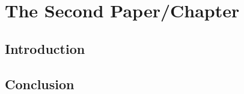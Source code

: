 \chapter{The Second Paper/Chapter}

\section{Introduction}
\lipsum[1-4]

\section{Conclusion}
\lipsum[5-8]